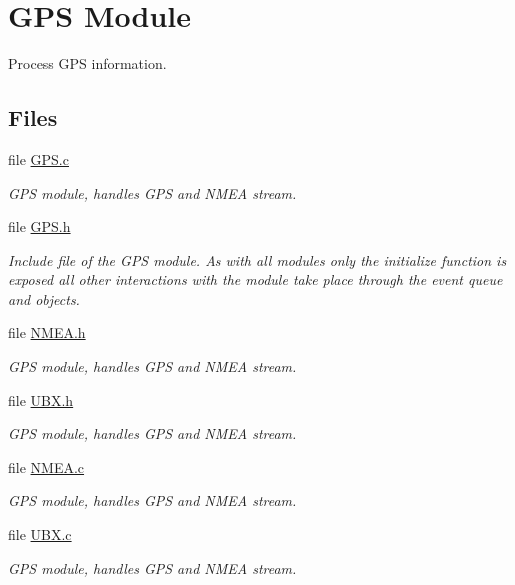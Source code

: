 \hypertarget{group___g_s_p_module}{\section{G\-P\-S Module}
\label{group___g_s_p_module}
}


Process G\-P\-S information.  


\subsection*{Files}
\begin{DoxyCompactItemize}
\item 
file \hyperlink{_g_p_s_8c}{G\-P\-S.\-c}
\begin{DoxyCompactList}\small\item\em G\-P\-S module, handles G\-P\-S and N\-M\-E\-A stream. \end{DoxyCompactList}\item 
file \hyperlink{_g_p_s_8h}{G\-P\-S.\-h}
\begin{DoxyCompactList}\small\item\em Include file of the G\-P\-S module. As with all modules only the initialize function is exposed all other interactions with the module take place through the event queue and objects. \end{DoxyCompactList}\item 
file \hyperlink{_n_m_e_a_8h}{N\-M\-E\-A.\-h}
\begin{DoxyCompactList}\small\item\em G\-P\-S module, handles G\-P\-S and N\-M\-E\-A stream. \end{DoxyCompactList}\item 
file \hyperlink{_u_b_x_8h}{U\-B\-X.\-h}
\begin{DoxyCompactList}\small\item\em G\-P\-S module, handles G\-P\-S and N\-M\-E\-A stream. \end{DoxyCompactList}\item 
file \hyperlink{_n_m_e_a_8c}{N\-M\-E\-A.\-c}
\begin{DoxyCompactList}\small\item\em G\-P\-S module, handles G\-P\-S and N\-M\-E\-A stream. \end{DoxyCompactList}\item 
file \hyperlink{_u_b_x_8c}{U\-B\-X.\-c}
\begin{DoxyCompactList}\small\item\em G\-P\-S module, handles G\-P\-S and N\-M\-E\-A stream. \end{DoxyCompactList}\end{DoxyCompactItemize}

